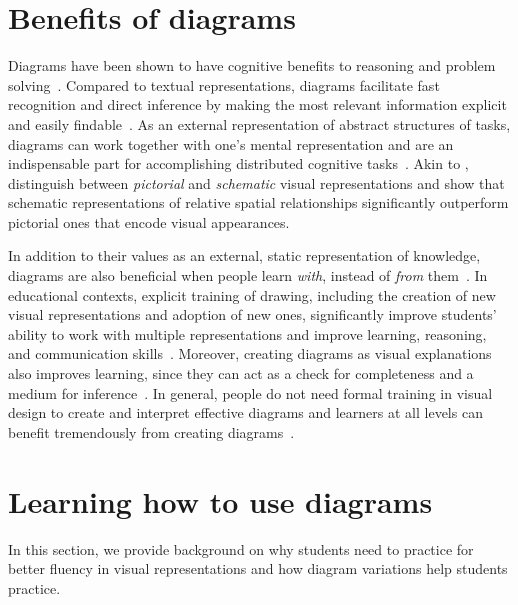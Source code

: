 
\section{Benefits of diagrams}


Diagrams have been shown to have cognitive benefits to reasoning and problem solving~\cite{whyDiagramWorth, koedinger_emergent_1992, mayer_multimedia_2002}. Compared to textual representations, diagrams facilitate fast recognition and direct inference by making the most relevant information explicit and easily findable~\cite{whyDiagramWorth}. As an external representation of abstract structures of tasks, diagrams can work together with one's mental representation and are an indispensable part for accomplishing distributed cognitive tasks~\cite{DistributedCognitive}. Akin to \citet{designingWithDiagrams}, \citet{hegarty_types_1999} distinguish between \emph{pictorial} and \emph{schematic} visual representations and show that schematic representations of relative spatial relationships significantly outperform pictorial ones that encode visual appearances.

In addition to their values as an external, static representation of knowledge, diagrams are also beneficial when people learn \emph{with}, instead of \emph{from} them~\cite{tippett_what_2016}. In educational contexts, explicit training of drawing, including the creation of new visual representations and adoption of new ones, significantly improve students' ability to work with multiple representations and improve learning, reasoning, and communication skills~\cite{ainsworth_drawing_2011}. Moreover, creating diagrams as visual explanations also improves learning, since they can act as a check for completeness and a medium for inference~\cite{bobek_creating_2016}. In general, people do not need formal training in visual design to create and interpret effective diagrams and learners at all levels can benefit tremendously from creating diagrams~\cite{ABC}.

\section{Learning how to use diagrams}

In this section, we provide background on why students need to practice for better fluency in visual representations and how diagram variations help students practice.

